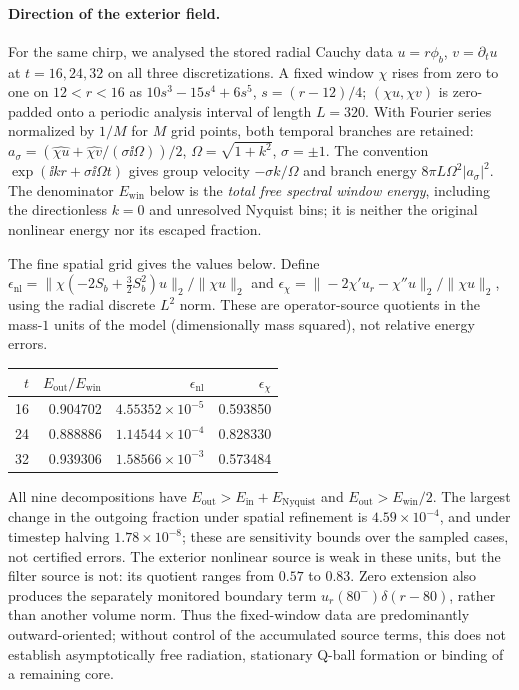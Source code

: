 \paragraph{Direction of the exterior field.}
For the same chirp, we analysed the stored radial Cauchy data
$u=r\phi_b$, $v=\partial_tu$ at $t=16,24,32$ on all three discretizations.
A fixed window $\chi$ rises from zero to one on $12<r<16$ as
$10s^3-15s^4+6s^5$, $s=(r-12)/4$; $(\chi u,\chi v)$ is zero-padded
onto a periodic analysis interval of length $L=320$. With Fourier series
normalized by $1/M$ for $M$ grid points, both temporal branches are retained:
$a_\sigma=(\widehat{\chi u}+\widehat{\chi v}/(\sigma\ii\Omega))/2$,
$\Omega=\sqrt{1+k^2}$, $\sigma=\pm1$.
The convention $\exp(\ii k r+\sigma\ii\Omega t)$ gives group velocity
$-\sigma k/\Omega$ and branch energy $8\pi L\Omega^2|a_\sigma|^2$.
The denominator $E_{\mathrm{win}}$ below is the \emph{total free spectral window
energy}, including the directionless $k=0$ and unresolved Nyquist bins;
it is neither the original nonlinear energy nor its escaped fraction.

The fine spatial grid gives the values below. Define
$\epsilon_{\mathrm{nl}}=\|\chi(-2S_b+\tfrac32 S_b^2)u\|_2/\|\chi u\|_2$
and $\epsilon_\chi=\|-2\chi'u_r-\chi''u\|_2/\|\chi u\|_2$,
using the radial discrete $L^2$ norm. These are operator-source quotients
in the mass-$1$ units of the model (dimensionally mass squared), not
relative energy errors.
\begin{center}
\begin{tabular}{rrrr}
\toprule
$t$ & $E_{\mathrm{out}}/E_{\mathrm{win}}$ & $\epsilon_{\mathrm{nl}}$ & $\epsilon_\chi$\\
\midrule
16 & 0.904702 & $4.55352\times10^{-5}$ & 0.593850\\
24 & 0.888886 & $1.14544\times10^{-4}$ & 0.828330\\
32 & 0.939306 & $1.58566\times10^{-3}$ & 0.573484\\
\bottomrule
\end{tabular}
\end{center}

All nine decompositions have $E_{\mathrm{out}}>E_{\mathrm{in}}+E_{\mathrm{Nyquist}}$
and $E_{\mathrm{out}}>E_{\mathrm{win}}/2$. The largest change in the outgoing
fraction under spatial refinement is $4.59\times10^{-4}$, and under
timestep halving $1.78\times10^{-8}$; these are sensitivity bounds over
the sampled cases, not certified errors. The exterior nonlinear source
is weak in these units, but the filter source is not: its quotient ranges
from $0.57$ to $0.83$. Zero extension also produces the separately monitored
boundary term $u_r(80^-)\delta(r-80)$, rather than another volume norm.
Thus the fixed-window data are predominantly outward-oriented; without
control of the accumulated source terms, this does not establish
asymptotically free radiation, stationary Q-ball formation or binding of
a remaining core.
